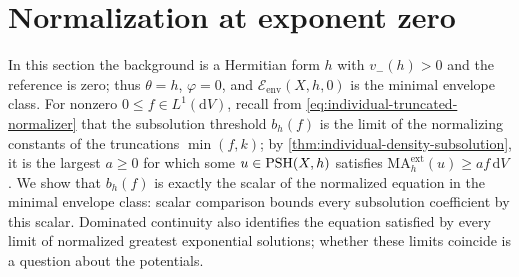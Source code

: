 \section{Normalization at exponent zero}

In this section the background is a Hermitian form $h$ with $v_-(h)>0$ and the reference is zero; thus $\theta=h$, $\varphi=0$, and $\mathcal E_{\mathrm{env}}(X,h,0)$ is the minimal envelope class. For nonzero $0\leq f\in L^1(\mathrm{d}V)$, recall from \eqref{eq:individual-truncated-normalizer} that the subsolution threshold $b_h(f)$ is the limit of the normalizing constants of the truncations $\min(f,k)$; by \cref{thm:individual-density-subsolution}, it is the largest $a\geq0$ for which some $u\in\mathrm{PSH}(X,h)$ satisfies $\mathrm{MA}^{\mathrm{ext}}_h(u)\geq af\,\mathrm{d}V$. We show that $b_h(f)$ is exactly the scalar of the normalized equation in the minimal envelope class: scalar comparison bounds every subsolution coefficient by this scalar. Dominated continuity also identifies the equation satisfied by every limit of normalized greatest exponential solutions; whether these limits coincide is a question about the potentials.

